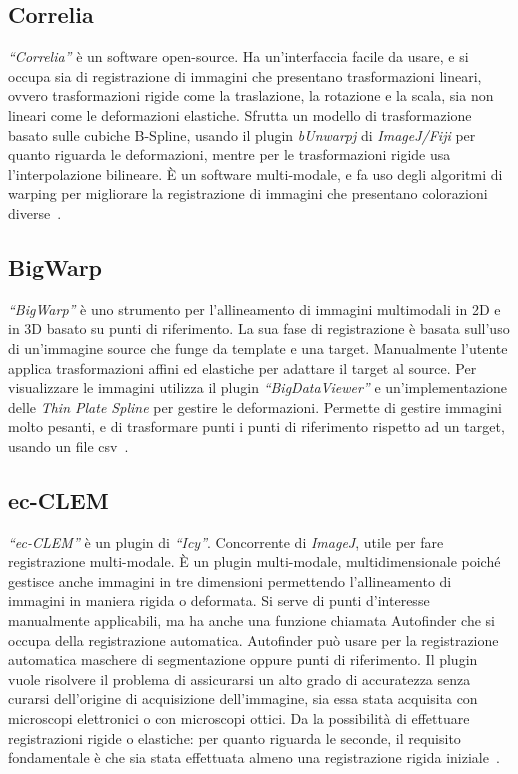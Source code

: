 \subsection{Correlia}
\noindent \textit{``Correlia''} è un software open-source. Ha un'interfaccia facile da usare, e si occupa sia di registrazione di immagini che presentano trasformazioni lineari, ovvero trasformazioni rigide come la traslazione, la rotazione e la scala, sia non lineari come le deformazioni elastiche. Sfrutta un modello di trasformazione basato sulle cubiche B-Spline, usando il plugin \textit{bUnwarpj} di \textit{ImageJ/Fiji} per quanto riguarda le deformazioni, mentre per le trasformazioni rigide usa l'interpolazione bilineare. È un software multi-modale, e fa uso degli algoritmi di warping per migliorare la registrazione di immagini che presentano colorazioni diverse~\cite{https://doi.org/10.1111/jmi.12928}.

\subsection{BigWarp}
\noindent \textit{``BigWarp''} è uno strumento per l'allineamento di immagini multimodali in 2D e in 3D basato su punti di riferimento. La sua fase di registrazione è basata sull'uso di un'immagine source che funge da template e una target. Manualmente l'utente applica trasformazioni affini ed elastiche per adattare il target al source. Per visualizzare le immagini utilizza il plugin \textit{``BigDataViewer''} e un'implementazione delle \textit{Thin Plate Spline} per gestire le deformazioni. Permette di gestire immagini molto pesanti, e di trasformare punti i punti di riferimento rispetto ad un target, usando un file csv~\cite{7493463}.

\subsection{ec-CLEM}
\noindent \textit{``ec-CLEM''} è un plugin di \textit{``Icy''}. Concorrente di \textit{ImageJ}, utile per fare registrazione multi-modale. È un plugin multi-modale, multidimensionale poiché gestisce anche immagini in tre dimensioni permettendo l'allineamento di immagini in maniera rigida o deformata. Si serve di punti d'interesse manualmente applicabili, ma ha anche una funzione chiamata Autofinder che si occupa della registrazione automatica. Autofinder può usare per la registrazione automatica maschere di segmentazione oppure punti di riferimento. Il plugin vuole risolvere il problema di assicurarsi un alto grado di accuratezza senza curarsi dell'origine di acquisizione dell'immagine, sia essa stata acquisita con microscopi elettronici o con microscopi ottici. Da la possibilità di effettuare registrazioni rigide o elastiche: per quanto riguarda le seconde, il requisito fondamentale è che sia stata effettuata almeno una registrazione rigida iniziale~\cite{PaulGilloteaux2017}.

